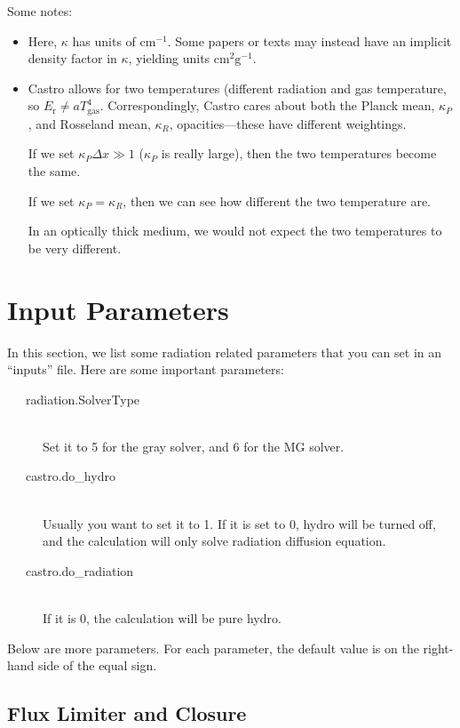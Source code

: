 \documentclass[11pt,letterpaper]{article}
\begin{document}
Some notes:
\begin{itemize}
\item Here, $\kappa$ has units of $\mathrm{cm}^{-1}$.  Some papers or
  texts may instead have an implicit density factor in $\kappa$,
  yielding units $\mathrm{cm}^2 \mathrm{g}^{-1}$.

\item Castro allows for two temperatures (different radiation and gas
  temperature, so $E_\mathrm{r} \ne a T_\mathrm{gas}^4$.
  Correspondingly, Castro cares about both the Planck mean,
  $\kappa_P$, and Rosseland mean, $\kappa_R$, opacities---these have
  different weightings.
  
  If we set $\kappa_P \Delta x \gg 1$ ($\kappa_P$ is really large),
  then the two temperatures become the same.

  If we set $\kappa_P = \kappa_R$, then we can see how different the
  two temperature are.

  In an optically thick medium, we would not expect the two temperatures
  to be very different.

\end{itemize}
  
  

\section{Input Parameters}

In this section, we list some radiation related parameters that you
can set in an ``inputs'' file.  Here are some important parameters:
\begin{description}
\item[\ \ \ radiation.SolverType] \hfill \\
  Set it to 5 for the gray solver, and 6 for the MG solver.
\item[\ \ \ castro.do\_hydro] \hfill \\
  Usually you want to set it to 1.  If it is set to 0, hydro will be
  turned off, and the calculation will only solve radiation diffusion
  equation.
\item[\ \ \ castro.do\_radiation] \hfill \\
  If it is 0, the calculation will be pure hydro.
\end{description}

Below are more parameters.  For each parameter, the default value is
on the right-hand side of the equal sign. 

\subsection{Flux Limiter and Closure}
\end{document}
